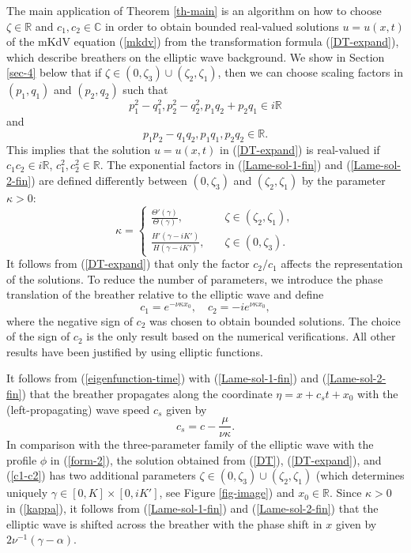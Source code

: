 \documentclass[12pt,reqno]{amsart}
\numberwithin{equation}{section}
\newcommand{\R}{\mathbb{R}}
\begin{document}
The main application of Theorem \ref{th-main} is an algorithm on how to choose $\zeta \in \R$ and $c_1,c_2 \in \mathbb{C}$ in order to obtain bounded real-valued solutions $u = u(x,t)$ of the mKdV equation (\ref{mkdv}) from the transformation formula (\ref{DT-expand}), which describe breathers on the elliptic wave background. We show in Section \ref{sec-4} below that if $\zeta \in (0,\zeta_3) \cup (\zeta_2,\zeta_1)$, then we can choose scaling factors in $(p_1,q_1)$ and $(p_2,q_2)$ such that 
\begin{equation}
\label{condition-1}
p_1^2 - q_1^2, p_2^2 - q_2^2, p_1q_2 + p_2 q_1 \in i \mathbb{R}
\end{equation}
and 
\begin{equation}
\label{condition-2}
p_1p_2 - q_1 q_2, p_1 q_1, p_2 q_2 \in \mathbb{R}.
\end{equation}
This implies that the solution $u = u(x,t)$ in (\ref{DT-expand}) is real-valued if $c_1 c_2 \in i \mathbb{R}$, $c_1^2,c_2^2 \in \mathbb{R}$. The exponential factors in (\ref{Lame-sol-1-fin}) and (\ref{Lame-sol-2-fin}) are defined differently between $(0,\zeta_3)$ and $(\zeta_2,\zeta_1)$ by the parameter $\kappa > 0$:
\begin{equation}
\label{kappa}
\kappa = \left\{ \begin{array}{ll} 
	\frac{\Theta'(\gamma)}{\Theta(\gamma)}, \quad & \zeta \in (\zeta_2,\zeta_1), \\
	\frac{H'(\gamma - iK')}{H(\gamma - iK')}, \quad & \zeta \in (0,\zeta_3). \end{array} \right.
\end{equation}
It follows from (\ref{DT-expand}) that only the factor $c_2/c_1$ affects the representation of the solutions. To reduce the number of parameters, we introduce the phase translation of the breather relative to the elliptic wave and define
\begin{equation}
\label{c1-c2}
c_1 = e^{-\nu \kappa x_0 }, \quad 
c_2 = -i e^{\nu \kappa x_0 },
\end{equation}
where the negative sign of $c_2$ was chosen to obtain bounded solutions. 
The choice of the sign of $c_2$ is the only result based on 
the numerical verifications. All other results 
have been justified by using elliptic functions.

It follows from (\ref{eigenfunction-time}) 
with (\ref{Lame-sol-1-fin}) and (\ref{Lame-sol-2-fin}) that the breather  
propagates along the coordinate $\eta = x + c_s t + x_0$ with 
the (left-propagating) wave speed $c_s$ given by 
\begin{equation}
\label{speed}
c_s = c - \frac{\mu}{\nu \kappa}.
\end{equation}
In comparison with the three-parameter family of the elliptic wave 
with the profile $\phi$ in (\ref{form-2}), the solution obtained 
from (\ref{DT}), (\ref{DT-expand}), and (\ref{c1-c2}) has two additional parameters $\zeta \in (0,\zeta_3) \cup (\zeta_2,\zeta_1)$ (which determines uniquely $\gamma \in [0,K] \times [0,iK']$, see Figure \ref{fig-image}) and $x_0 \in \mathbb{R}$. Since $\kappa > 0$ in (\ref{kappa}), it follows from (\ref{Lame-sol-1-fin}) and (\ref{Lame-sol-2-fin}) that the elliptic wave is shifted across the breather with the phase shift in $x$ given by $2 \nu^{-1} (\gamma - \alpha)$.
\end{document}
